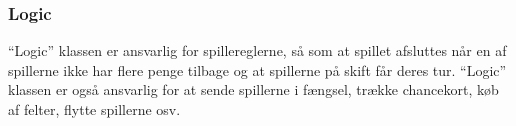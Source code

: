 \subsubsection{Logic}
“Logic” klassen er ansvarlig for spillereglerne, så som at spillet afsluttes når en af spillerne ikke har flere penge tilbage og at spillerne på skift får deres tur. “Logic” klassen er også ansvarlig for at sende spillerne i fængsel, trække chancekort, køb af felter, flytte spillerne osv. 